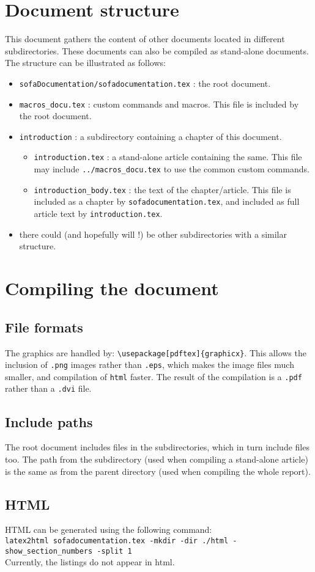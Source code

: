\documentclass[a4paper,10pt]{report}
\begin{document}
\section{Document structure}
This document gathers the content of other documents located in different subdirectories. These documents can also be compiled as stand-alone documents.
The structure can be illustrated as follows:
\begin{itemize}
 \item \texttt{sofaDocumentation/sofadocumentation.tex} : the root document.
 \item \texttt{macros\_docu.tex} : custom commands and macros. This file is included by the root document.
 \item \texttt{introduction} : a subdirectory containing a chapter of this document.
\begin{itemize}
 \item \texttt{introduction.tex} : a stand-alone article containing the same. This file may include \texttt{../macros\_docu.tex} to use the common custom commands.
 \item \texttt{introduction\_body.tex} : the text of the chapter/article. This file is included as a chapter by \texttt{sofadocumentation.tex}, and included as full article text by \texttt{introduction.tex}.
\end{itemize}
 \item there could (and hopefully will !) be other subdirectories with a similar structure.
\end{itemize}

\section{Compiling the document}
\subsection{File formats}
The graphics are handled by: \texttt{\textbackslash usepackage[pdftex]\{graphicx\}}. This allows the inclusion of \texttt{.png} images rather than \texttt{.eps}, which makes the image files much smaller, and compilation of \texttt{html} faster. The result of the compilation is a \texttt{.pdf} rather than a \texttt{.dvi} file.

\subsection{Include paths}
The root document includes files in the subdirectories, which in turn include files too. The path from the subdirectory (used when compiling a stand-alone article) is the same as from the parent directory (used when compiling the whole report).

\subsection{HTML}
HTML can be generated using the following command:\\
\texttt{latex2html sofadocumentation.tex -mkdir -dir ./html -show\_section\_numbers -split 1}
\\
Currently, the listings do not appear in html.



\end{document}
